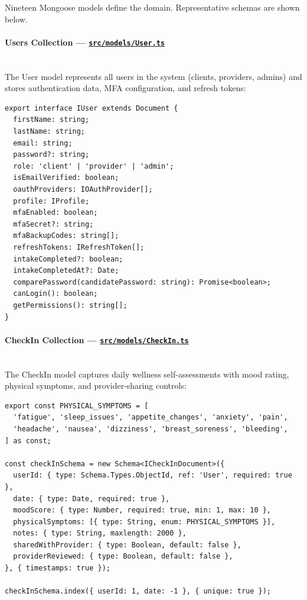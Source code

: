 \documentclass[12pt,letterpaper]{article}
\newcommand{\ghrepo}{https://github.com/omniV1/lunaraCare}
\begin{document}
Nineteen Mongoose models define the domain. Representative schemas are shown below.

\paragraph{Users Collection --- \href{\ghrepo/blob/main/backend/src/models/User.ts}{\texttt{src/models/User.ts}}}
\mbox{}\\
The User model represents all users in the system (clients, providers, admins) and stores authentication data, MFA configuration, and refresh tokens:

\begin{lstlisting}[caption={User model interface (\texttt{User.ts})}]
export interface IUser extends Document {
  firstName: string;
  lastName: string;
  email: string;
  password?: string;
  role: 'client' | 'provider' | 'admin';
  isEmailVerified: boolean;
  oauthProviders: IOAuthProvider[];
  profile: IProfile;
  mfaEnabled: boolean;
  mfaSecret?: string;
  mfaBackupCodes: string[];
  refreshTokens: IRefreshToken[];
  intakeCompleted?: boolean;
  intakeCompletedAt?: Date;
  comparePassword(candidatePassword: string): Promise<boolean>;
  canLogin(): boolean;
  getPermissions(): string[];
}
\end{lstlisting}

\paragraph{CheckIn Collection --- \href{\ghrepo/blob/main/backend/src/models/CheckIn.ts}{\texttt{src/models/CheckIn.ts}}}
\mbox{}\\
The CheckIn model captures daily wellness self-assessments with mood rating, physical symptoms, and provider-sharing controls:

\begin{lstlisting}[caption={CheckIn model with symptom tracking (\texttt{CheckIn.ts})}]
export const PHYSICAL_SYMPTOMS = [
  'fatigue', 'sleep_issues', 'appetite_changes', 'anxiety', 'pain',
  'headache', 'nausea', 'dizziness', 'breast_soreness', 'bleeding',
] as const;

const checkInSchema = new Schema<ICheckInDocument>({
  userId: { type: Schema.Types.ObjectId, ref: 'User', required: true },
  date: { type: Date, required: true },
  moodScore: { type: Number, required: true, min: 1, max: 10 },
  physicalSymptoms: [{ type: String, enum: PHYSICAL_SYMPTOMS }],
  notes: { type: String, maxlength: 2000 },
  sharedWithProvider: { type: Boolean, default: false },
  providerReviewed: { type: Boolean, default: false },
}, { timestamps: true });

checkInSchema.index({ userId: 1, date: -1 }, { unique: true });
\end{lstlisting}
\end{document}
